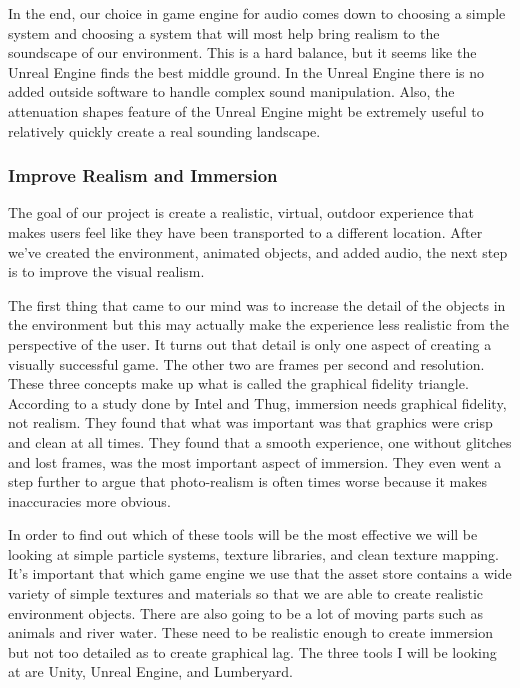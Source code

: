 \documentclass[10pt,journal,compsoc,onecolumn, draftclsnofoot]{IEEEtran}
\begin{document}
\begin{bibunit}
In the end, our choice in game engine for audio comes down to choosing a simple system and choosing a system that will most help bring realism to the soundscape of our environment.  This is a hard balance, but it seems like the Unreal Engine finds the best middle ground.  In the Unreal Engine there is no added outside software to handle complex sound manipulation.  Also, the attenuation shapes feature of the Unreal Engine might be extremely useful to relatively quickly create a real sounding landscape.

\subsubsection{Improve Realism and Immersion}
The goal of our project is create a realistic, virtual, outdoor experience that makes users feel like they have been transported to a different location.
After we’ve created the environment, animated objects, and added audio, the next step is to improve the visual realism.

The first thing that came to our mind was to increase the detail of the objects in the environment but this may actually make the experience less realistic from the perspective of the user.
It turns out that detail is only one aspect of creating a visually successful game.
The other two are frames per second and resolution.
These three concepts make up what is called the graphical fidelity triangle\cite{wilde_2014}.
According to a study done by Intel and Thug\cite{michalak_lind_round1}, immersion needs graphical fidelity, not realism.
They found that what was important was that graphics were crisp and clean at all times.
They found that a smooth experience, one without glitches and lost frames, was the most important aspect of immersion.
They even went a step further to argue that photo-realism is often times worse because it makes inaccuracies more obvious.

In order to find out which of these tools will be the most effective we will be looking at simple particle systems, texture libraries, and clean texture mapping.
It’s important that which game engine we use that the asset store contains a wide variety of simple textures and materials so that we are able to create realistic environment objects.
There are also going to be a lot of moving parts such as animals and river water.
These need to be realistic enough to create immersion but not too detailed as to create graphical lag.
The three tools I will be looking at are Unity, Unreal Engine, and Lumberyard.


\end{bibunit}
\end{document}
